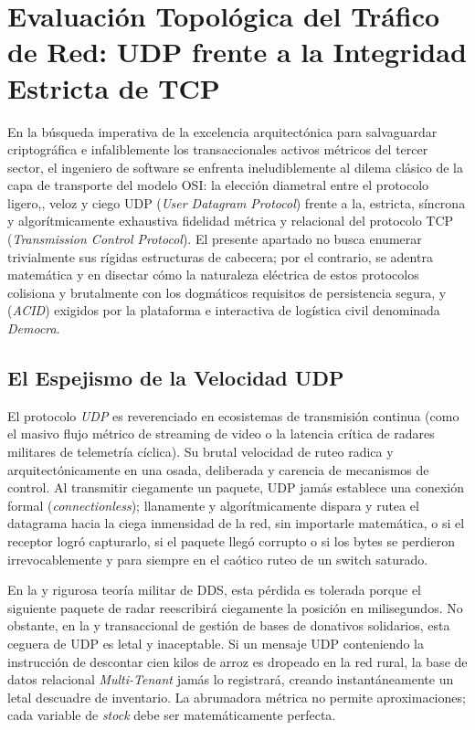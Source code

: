 \section{Evaluación Topológica del Tráfico de Red: UDP frente a la Integridad Estricta de TCP}

En la búsqueda imperativa de la excelencia arquitectónica para salvaguardar criptográfica e infaliblemente los transaccionales activos métricos del tercer sector, el ingeniero de software se enfrenta ineludiblemente al dilema clásico de la capa de transporte del modelo OSI: la elección diametral entre el protocolo ligero,, veloz y ciego UDP (\textit{User Datagram Protocol}) frente a la, estricta, síncrona y algorítmicamente exhaustiva fidelidad métrica y relacional del protocolo TCP (\textit{Transmission Control Protocol}). El presente apartado no busca enumerar trivialmente sus rígidas estructuras de cabecera; por el contrario, se adentra matemática y en disectar cómo la naturaleza eléctrica de estos protocolos colisiona y brutalmente con los dogmáticos requisitos de persistencia segura, y (\textit{ACID}) exigidos por la plataforma e interactiva de logística civil denominada \textit{Democra}.

\subsection{El Espejismo de la Velocidad UDP}

El protocolo \textit{UDP} es reverenciado en ecosistemas de transmisión continua (como el masivo flujo métrico de streaming de video o la latencia crítica de radares militares de telemetría cíclica). Su brutal velocidad de ruteo radica y arquitectónicamente en una osada, deliberada y carencia de mecanismos de control. Al transmitir ciegamente un paquete, UDP jamás establece una conexión formal (\textit{connectionless}); llanamente y algorítmicamente dispara y rutea el datagrama hacia la ciega inmensidad de la red, sin importarle matemática, o si el receptor logró capturarlo, si el paquete llegó corrupto o si los bytes se perdieron irrevocablemente y para siempre en el caótico ruteo de un switch saturado.

En la y rigurosa teoría militar de DDS, esta pérdida es tolerada porque el siguiente paquete de radar reescribirá ciegamente la posición en milisegundos. No obstante, en la y transaccional de gestión de bases de donativos solidarios, esta ceguera de UDP es letal y inaceptable. Si un mensaje UDP conteniendo la instrucción de descontar cien kilos de arroz es dropeado en la red rural, la base de datos relacional \textit{Multi-Tenant} jamás lo registrará, creando instantáneamente un letal descuadre de inventario. La abrumadora métrica no permite aproximaciones; cada variable de \textit{stock} debe ser matemáticamente perfecta.

